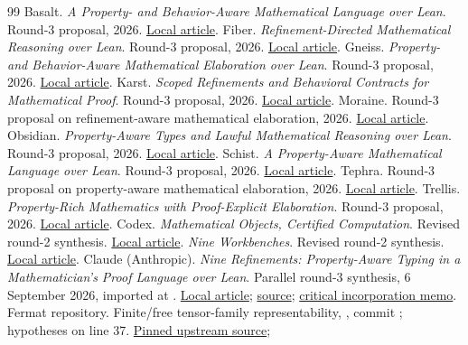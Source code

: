 \documentclass[11pt,letterpaper]{article}
\newcommand{\code}[1]{\texttt{\detokenize{#1}}}
\theoremstyle{definition}\newtheorem{definition}[proposition]{Definition}
\theoremstyle{remark}\newtheorem{remark}[proposition]{Remark}
\begin{document}
\clearpage
\begin{thebibliography}{99}
 Basalt. \emph{A Property- and Behavior-Aware Mathematical Language over Lean}.
Round-3 proposal, 2026. \href{../ideas/basalt/basalt.pdf}{Local article}.
 Fiber. \emph{Refinement-Directed Mathematical Reasoning over Lean}.
Round-3 proposal, 2026. \href{../ideas/fiber/fiber.pdf}{Local article}.
 Gneiss. \emph{Property- and Behavior-Aware Mathematical Elaboration over Lean}.
Round-3 proposal, 2026. \href{../ideas/gneiss/gneiss.pdf}{Local article}.
 Karst. \emph{Scoped Refinements and Behavioral Contracts for Mathematical Proof}.
Round-3 proposal, 2026. \href{../ideas/karst/karst.pdf}{Local article}.
 Moraine. Round-3 proposal on refinement-aware mathematical elaboration, 2026.
\href{../ideas/moraine/moraine.pdf}{Local article}.
 Obsidian. \emph{Property-Aware Types and Lawful Mathematical Reasoning over Lean}.
Round-3 proposal, 2026. \href{../ideas/obsidian/obsidian.pdf}{Local article}.
 Schist. \emph{A Property-Aware Mathematical Language over Lean}.
Round-3 proposal, 2026. \href{../ideas/schist/schist.pdf}{Local article}.
 Tephra. Round-3 proposal on property-aware mathematical elaboration, 2026.
\href{../ideas/tephra/tephra.pdf}{Local article}.
 Trellis. \emph{Property-Rich Mathematics with Proof-Explicit Elaboration}.
Round-3 proposal, 2026. \href{../ideas/trellis/trellis.pdf}{Local article}.
 Codex. \emph{Mathematical Objects, Certified Computation}.
Revised round-2 synthesis. \href{../../round-2/synthesis/unified-report.pdf}{Local article}.
 \emph{Nine Workbenches}. Revised round-2 synthesis.
\href{../../round-2/unified_report/unified_report.pdf}{Local article}.
 Claude (Anthropic). \emph{Nine Refinements:
Property-Aware Typing in a Mathematician's Proof Language over Lean}.
Parallel round-3 synthesis, 6 September 2026, imported at \code{8ddc6ab}.
\href{../unified_report/unified_report.pdf}{Local article};
\href{../unified_report/unified_report.tex}{source};
\href{review-notes/parallel-synthesis-review.md}{critical incorporation memo}.
 Fermat repository. Finite/free tensor-family representability,
, commit
\code{aa2d8b3}; hypotheses on line 37.
\href{https://github.com/anthropics/fermats-last-theorem/blob/aa2d8b34692b16c70f699536de0d8e75b9a3e9ef/P2M/Sol/S_Algebra_exists_algHom_equiv_pi.lean#L37}{Pinned upstream source};

\end{thebibliography}
\end{document}
